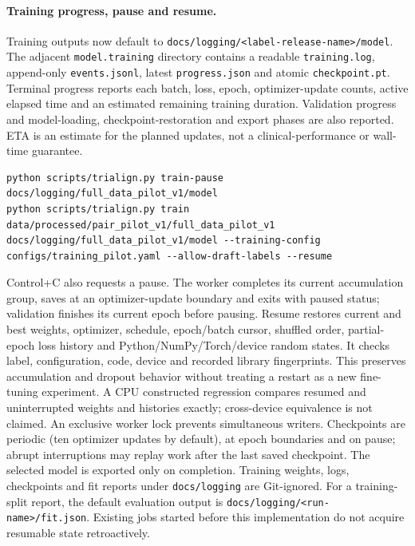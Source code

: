 \documentclass[10pt,letterpaper]{article}
\newcommand{\pathcode}[1]{\nolinkurl{#1}}
\begin{document}
\paragraph{Training progress, pause and resume.}
Training outputs now default to \pathcode{docs/logging/<label-release-name>/model}.
The adjacent \pathcode{model.training} directory contains a readable
\pathcode{training.log}, append-only \pathcode{events.jsonl}, latest
\pathcode{progress.json} and atomic \pathcode{checkpoint.pt}. Terminal progress
reports each batch, loss, epoch, optimizer-update counts, active elapsed time and
an estimated remaining training duration. Validation progress and model-loading,
checkpoint-restoration and export phases are also reported. ETA is an estimate
for the planned updates, not a clinical-performance or wall-time guarantee.
\begin{Verbatim}[breaklines=true,fontsize=\small]
python scripts/trialign.py train-pause docs/logging/full_data_pilot_v1/model
python scripts/trialign.py train data/processed/pair_pilot_v1/full_data_pilot_v1 docs/logging/full_data_pilot_v1/model --training-config configs/training_pilot.yaml --allow-draft-labels --resume
\end{Verbatim}
Control+C also requests a pause. The worker completes its current accumulation
group, saves at an optimizer-update boundary and exits with paused status;
validation finishes its current epoch before pausing. Resume restores current
and best weights, optimizer, schedule, epoch/batch cursor, shuffled order,
partial-epoch loss history and Python/NumPy/Torch/device random states. It checks
label, configuration, code, device and recorded library fingerprints. This
preserves accumulation and dropout behavior without treating a restart as a new
fine-tuning experiment. A CPU constructed regression compares resumed and
uninterrupted weights and histories exactly; cross-device equivalence is not
claimed. An exclusive worker lock prevents simultaneous writers. Checkpoints
are periodic (ten optimizer updates by default), at epoch boundaries and on
pause; abrupt interruptions may replay work after the last saved checkpoint.
The selected model is exported only on completion. Training weights, logs,
checkpoints and fit reports under \pathcode{docs/logging} are Git-ignored.
For a training-split report, the default evaluation output is
\pathcode{docs/logging/<run-name>/fit.json}. Existing jobs started before this
implementation do not acquire resumable state retroactively.
\end{document}
